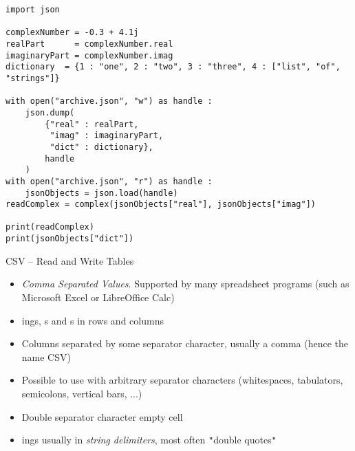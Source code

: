 
\begin{frame}[fragile]
%
\begin{codebox}
\begin{verbatim}
import json

complexNumber = -0.3 + 4.1j
realPart      = complexNumber.real
imaginaryPart = complexNumber.imag
dictionary  = {1 : "one", 2 : "two", 3 : "three", 4 : ["list", "of", "strings"]}

with open("archive.json", "w") as handle :
    json.dump(
        {"real" : realPart,
         "imag" : imaginaryPart,
         "dict" : dictionary},
        handle
    )
with open("archive.json", "r") as handle :
    jsonObjects = json.load(handle)
readComplex = complex(jsonObjects["real"], jsonObjects["imag"])

print(readComplex)
print(jsonObjects["dict"])
\end{verbatim}
\end{codebox}
%
\end{frame}


\begin{frame}[fragile]{CSV -- Read and Write Tables}
%
\begin{itemize}
\item \emph{Comma Separated Values}. Supported by many spreadsheet programs (such as Microsoft Excel or LibreOffice Calc)
\item {}ings, s and s in rows and columns
\item Columns separated by some separator character, usually a comma (hence the name CSV)
\item Possible to use with arbitrary separator characters (\eg whitespaces, tabulators, semicolons, vertical bars, ...)
\item Double separator character \Thus empty cell
\item {}ings usually in \emph{string delimiters}, most often  \texttt{"}double quotes\texttt{"}
\end{itemize}
%
\end{frame}


